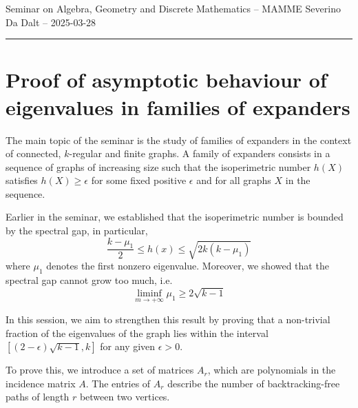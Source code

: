 \documentclass[11pt]{article}
\theoremstyle{definition}
\begin{document}
    {\Large Seminar on Algebra, Geometry and Discrete Mathematics -- MAMME}
    \newline
    {Severino Da Dalt -- 2025-03-28}

    \vspace{0.5cm}

    \hrule

    \vspace{0.5cm}

    \section{Proof of asymptotic behaviour of eigenvalues in families of expanders}\label{sec:section}
    The main topic of the seminar is the study of families of expanders in the context of connected, $k$-regular and finite graphs.
    A family of expanders consists in a sequence of graphs of increasing size such that the isoperimetric number $h(X)$ satisfies $h(X) \geq \epsilon$
    for some fixed positive $\epsilon$ and for all graphs $X$ in the sequence.
    \newline

    Earlier in the seminar, we established that the isoperimetric number is bounded by the spectral gap, in particular,
    $$\frac{k - \mu_1}{2} \leq h(x) \leq \sqrt{2k(k - \mu_1)}$$
    where $\mu_1$ denotes the first nonzero eigenvalue.
    Moreover, we showed that the spectral gap cannot grow too much, i.e.
    $$\liminf\limits_{m \rightarrow +\infty}\mu_1 \geq 2 \sqrt{k-1}$$

    In this session, we aim to strengthen this result by proving that a non-trivial fraction of the eigenvalues of the
    graph lies within the interval $[(2 - \epsilon) \sqrt{k-1}, k]$ for any given $\epsilon > 0$.
    \newline

    To prove this, we introduce a set of matrices $A_r$, which are polynomials in the incidence matrix $A$.
    The entries of $A_r$ describe the number of backtracking-free paths of length $r$ between two vertices.
    \newline
\end{document}
